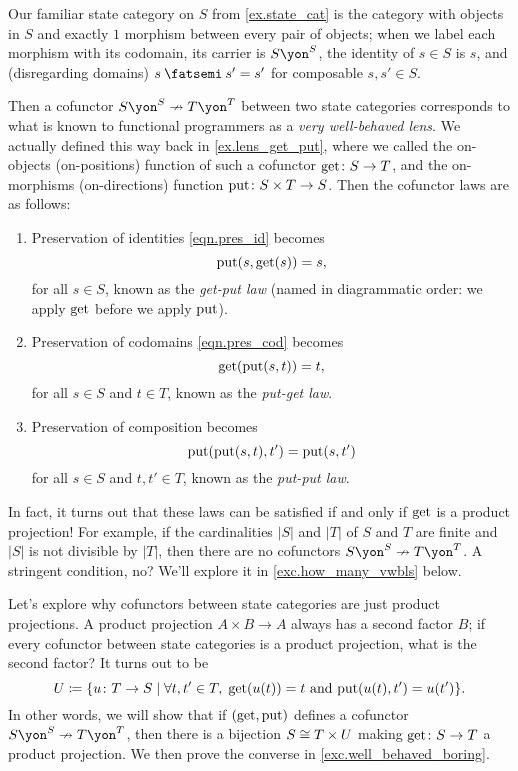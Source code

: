 \documentclass[Book-Poly]{subfiles}
\begin{document}
\begin{example} \label{ex.very_well_behaved_lenses}
Our familiar state category on $S$ from \cref{ex.state_cat} is the category with objects in $S$ and exactly $1$ morphism between every pair of objects; when we label each morphism with its codomain, its carrier is $S\yon^S$, the identity of $s\in S$ is $s$, and (disregarding domains) $s\then s'=s'$ for composable $s,s'\in S$.

Then a cofunctor $S\yon^S\cof T\yon^T$ between two state categories corresponds to what is known to functional programmers as a \emph{very well-behaved lens}.
We actually defined this way back in \cref{ex.lens_get_put}, where we called the on-objects (on-positions) function of such a cofunctor $\mathrm{get}\colon S\to T$, and the on-morphisms (on-directions) function $\mathrm{put}\colon S\times T\to S$.%
Then the cofunctor laws are as follows:
\begin{enumerate}
    \item Preservation of identities \eqref{eqn.pres_id} becomes
    \[
        \mathrm{put}(s,\mathrm{get}(s))=s,
    \]
    for all $s\in S$, known as the \emph{get-put law} (named in diagrammatic order: we apply $\mathrm{get}$ before we apply $\mathrm{put}$).
    
    \item Preservation of codomains \eqref{eqn.pres_cod} becomes
    \[
        \mathrm{get}(\mathrm{put}(s,t))=t,
    \]
    for all $s\in S$ and $t\in T$, known as the \emph{put-get law}.
    
    \item Preservation of composition becomes
    \[
        \mathrm{put}(\mathrm{put}(s,t),t')=\mathrm{put}(s,t')
    \]
    for all $s\in S$ and $t,t'\in T$, known as the \emph{put-put law}.
\end{enumerate}

In fact, it turns out that these laws can be satisfied if and only if $\mathrm{get}$ is a product projection! 
For example, if the cardinalities $|S|$ and $|T|$ of $S$ and $T$ are finite and $|S|$ is not divisible by $|T|$, then there are no cofunctors $S\yon^S\cof T\yon^T$.
A stringent condition, no?
We'll explore it in  \cref{exc.how_many_vwbls} below.

Let's explore why cofunctors between state categories are just product projections.
A product projection $A\times B\to A$ always has a second factor $B$; if every cofunctor between state categories is a product projection, what is the second factor?
It turns out to be
\[
    U\coloneqq\{u\colon T\to S\mid \forall t,t'\in T,\;\mathrm{get}(u(t))=t\text{ and }\mathrm{put}(u(t),t')=u(t')\}.
\]
In other words, we will show that if $(\mathrm{get},\mathrm{put})$ defines a cofunctor $S\yon^S\cof T\yon^T$, then there is a bijection $S\cong T\times U$ making $\mathrm{get}\colon S\to T$ a product projection.
We then prove the converse in \cref{exc.well_behaved_boring}.


\end{example}
\end{document}
